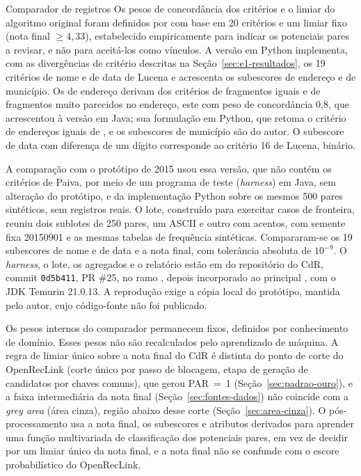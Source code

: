 \begin{chapter}{Comparador de registros}
Os pesos de concordância dos critérios e o limiar do algoritmo original foram definidos por  com base em 20 critérios e um limiar fixo (nota final $\geq 4{,}33$), estabelecido empiricamente para indicar os potenciais pares a revisar, e não para aceitá-los como vínculos. A versão em Python implementa, com as divergências de critério descritas na Seção~\ref{sec:e1-resultados}, os 19 critérios de nome e de data de Lucena \citeyearpar{Lucena2013algoritmos} e acrescenta os subescores de endereço e de município. Os de endereço derivam dos critérios de fragmentos iguais e de fragmentos muito parecidos no endereço, este com peso de concordância 0,8, que  acrescentou à versão em Java; sua formulação em Python, que retoma o critério de endereços iguais de , e os subescores de município são do autor. O subescore de data com diferença de um dígito corresponde ao critério 16 de Lucena, binário.

A comparação com o protótipo de 2015 usou essa versão, que não contém os critérios de Paiva, por meio de um programa de teste (\textit{harness}) em Java, sem alteração do protótipo, e da implementação Python sobre os mesmos 500 pares sintéticos, sem registros reais. O lote, construído para exercitar casos de fronteira, reuniu dois sublotes de 250 pares, um ASCII e outro com acentos, com semente fixa 20150901 e as mesmas tabelas de frequência sintéticas. Compararam-se os 19 subescores de nome e de data e a nota final, com tolerância absoluta de $10^{-9}$. O \textit{harness}, o lote, os agregados e o relatório estão em  do repositório do CdR, commit \texttt{0d5b411}, PR \#25, no ramo , depois incorporado ao principal \cite{Jardim2025comparador}, com o JDK Temurin 21.0.13. A reprodução exige a cópia local do protótipo, mantida pelo autor, cujo código-fonte não foi publicado.

Os pesos internos do comparador permanecem fixos, definidos por conhecimento de domínio. Esses pesos não são recalculados pelo aprendizado de máquina. A regra de limiar único sobre a nota final do CdR é distinta do ponto de corte do OpenRecLink (corte único por passo de blocagem, etapa de geração de candidatos por chaves comuns), que gerou PAR~=~1 (Seção~\ref{sec:padrao-ouro}), e a faixa intermediária da nota final (Seção~\ref{sec:fontes-dados}) não coincide com a \textit{grey area} (área cinza), região abaixo desse corte (Seção~\ref{sec:area-cinza}). O pós-processamento usa a nota final, os subescores e atributos derivados para aprender uma função multivariada de classificação dos potenciais pares, em vez de decidir por um limiar único da nota final, e a nota final não se confunde com o escore probabilístico do OpenRecLink.


\end{chapter}
